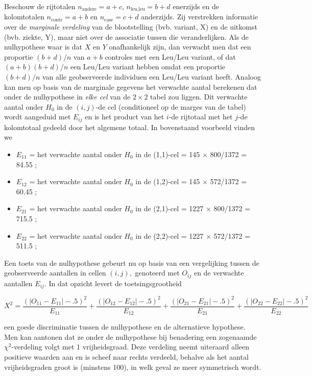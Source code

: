 \documentclass[
  12pt,dutch,coursenotes]{book}
\theoremstyle{definition}
\theoremstyle{definition}
\theoremstyle{definition}
\theoremstyle{definition}
\theoremstyle{remark}
\begin{document}
Beschouw de rijtotalen \(n_\text{andere}=a+c\), \(n_\text{leu,leu}=b+d\) enerzijds en de kolomtotalen \(n_\text{contr}=a+b\) en \(n_\text{case}=c+d\) anderzijds. Zij verstrekken informatie
over de \emph{marginale verdeling} van de blootstelling (bvb. variant, X) en de uitkomst (bvb. ziekte, Y),
maar niet over de associatie tussen die veranderlijken. Als de nulhypothese
waar is dat \(X\) en \(Y\) onafhankelijk zijn, dan verwacht men dat een proportie \((b+d)/n\)
van \(a+b\) controles met een Leu/Leu variant, of dat \((a+b)(b+d)/n\) een Leu/Leu variant hebben omdat een proportie \((b+d)/n\) van alle geobserveerde individuen een Leu/Leu variant heeft.
Analoog kan men op basis van de marginale gegevens het verwachte aantal berekenen dat onder de nulhypothese in \emph{elke cel} van de \(2\times 2\) tabel zou liggen.
Dit verwachte aantal onder \(H_0\) in de \((i,j)\)-de cel (conditioneel op de marges van de tabel) wordt aangeduid met \(E_{ij}\) en is het product
van het \(i\)-de rijtotaal met het \(j\)-de kolomtotaal gedeeld door het
algemene totaal. In bovenstaand voorbeeld vinden we

\begin{itemize}
\item
  \(E_{11}\) = het verwachte aantal onder \(H_0\) in de (1,1)-cel = 145 \(\times\) 800/1372 = 84.55 ;
\item
  \(E_{12}\) = het verwachte aantal onder \(H_0\) in de (1,2)-cel = 145 \(\times\) 572/1372 = 60.45 ;
\item
  \(E_{21}\) = het verwachte aantal onder \(H_0\) in de (2,1)-cel = 1227 \(\times\) 800/1372 = 715.5 ;
\item
  \(E_{22}\) = het verwachte aantal onder \(H_0\) in de (2,2)-cel = 1227 \(\times\) 572/1372 = 511.5 ;
\end{itemize}

Een toets van de nulhypothese gebeurt nu op basis van een vergelijking
tussen de geobserveerde aantallen in cellen \((i,j),\) genoteerd met \(O_{ij}\)
en de verwachte aantallen \(E_{ij}\). In dat opzicht levert de
toetsingsgrootheid

\begin{equation*}
X^2 = \frac{\left (|O_{11} - E_{11}| - .5 \right)^2 }{ E_{11}} + \frac{
\left ( |O_{12} - E_{12}| - .5 \right)^2 }{E_{12} }+ \frac{ \left ( |O_{21}
- E_{21}| - .5 \right)^2 }{E_{21}}+ \frac{ \left ( |O_{22} - E_{22}| - .5
\right)^2 }{E_{22} }
\end{equation*}

een goede discriminatie tussen de nulhypothese en de alternatieve hypothese.
Men kan aantonen dat ze onder de nulhypothese bij benadering een zogenaamde \(\chi^2\)-verdeling volgt met 1 vrijheidsgraad. Deze verdeling neemt uiteraard alleen positieve waarden aan en is scheef naar rechts verdeeld, behalve als het aantal vrijheidsgraden groot is (minstens 100), in welk
geval ze meer symmetrisch wordt.
\end{document}
